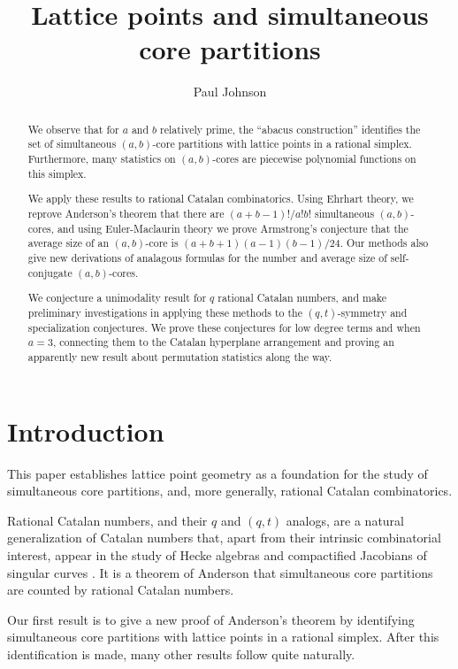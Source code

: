 \documentclass{amsart}[12pt]
\theoremstyle{definition}
\begin{document}
\title{Lattice points and simultaneous core partitions}
\begin{abstract}
We observe that for $a$ and $b$ relatively prime, the ``abacus construction'' identifies the set of simultaneous $(a,b)$-core partitions with lattice points in a rational simplex. Furthermore, many statistics on $(a,b)$-cores are piecewise polynomial functions on this simplex.  

We apply these results to rational Catalan combinatorics.  Using Ehrhart theory, we reprove Anderson's theorem \cite{anderson} that there are $(a+b-1)!/a!b!$ simultaneous $(a,b)$-cores, and using Euler-Maclaurin theory we prove Armstrong's conjecture \cite{AHJ} that the average size of an $(a,b)$-core is $(a+b+1)(a-1)(b-1)/24$.  Our methods also give new derivations of analagous formulas for the number and average size of self-conjugate $(a,b)$-cores. 

We conjecture a unimodality result for $q$ rational Catalan numbers, and make preliminary investigations in applying these methods to the $(q,t)$-symmetry and specialization conjectures.  We prove these conjectures for low degree terms and when $a=3$, connecting them to the Catalan hyperplane arrangement and proving an apparently new result about permutation statistics along the way.

\end{abstract}


\author{Paul Johnson}
\date{}
\maketitle
\section{Introduction}
This paper establishes lattice point geometry as a foundation for the study of simultaneous core partitions, and, more generally, rational Catalan combinatorics.

Rational Catalan numbers, and their $q$ and $(q,t)$ analogs, are a natural generalization of Catalan numbers that, apart from their intrinsic combinatorial interest, appear in the study of Hecke algebras \cite{GG} and compactified Jacobians of singular curves \cite{EM1, EM2}.  It is a theorem of Anderson that simultaneous core partitions are counted by rational Catalan numbers.  

 Our first result is to give a new proof of Anderson's theorem by identifying simultaneous core partitions with lattice points in a rational simplex.  After this identification is made, many other results follow quite naturally.  
\end{document}
